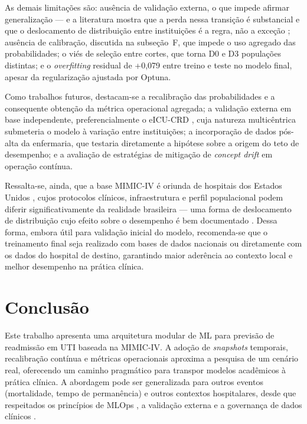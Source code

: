 \documentclass{ieeeaccess}
\begin{document}
As demais limitações são: ausência de validação externa, o que impede afirmar generalização --- e a literatura mostra que a perda nessa transição é substancial \cite{Koumantakis2025,Lim2025} e que o deslocamento de distribuição entre instituições é a regra, não a exceção \cite{Finlayson2021}; ausência de calibração, discutida na subseção~F, que impede o uso agregado das probabilidades; o viés de seleção entre cortes, que torna D0 e D3 populações distintas; e o \textit{overfitting} residual de +0,079 entre treino e teste no modelo final, apesar da regularização ajustada por Optuna.

Como trabalhos futuros, destacam-se a recalibração das probabilidades e a consequente obtenção da métrica operacional agregada; a validação externa em base independente, preferencialmente o eICU-CRD \cite{Pollard2018}, cuja natureza multicêntrica submeteria o modelo à variação entre instituições; a incorporação de dados pós-alta da enfermaria, que testaria diretamente a hipótese sobre a origem do teto de desempenho; e a avaliação de estratégias de mitigação de \textit{concept drift} em operação contínua.

Ressalta-se, ainda, que a base MIMIC-IV é oriunda de hospitais dos Estados Unidos \cite{Johnson2023}, cujos protocolos clínicos, infraestrutura e perfil populacional podem diferir significativamente da realidade brasileira --- uma forma de deslocamento de distribuição cujo efeito sobre o desempenho é bem documentado \cite{Finlayson2021}. Dessa forma, embora útil para validação inicial do modelo, recomenda-se que o treinamento final seja realizado com bases de dados nacionais ou diretamente com os dados do hospital de destino, garantindo maior aderência ao contexto local e melhor desempenho na prática clínica.


\section{Conclusão}
Este trabalho apresenta uma arquitetura modular de ML para previsão de readmissão em UTI baseada na MIMIC-IV. A adoção de \textit{snapshots} temporais, recalibração contínua e métricas operacionais aproxima a pesquisa de um cenário real, oferecendo um caminho pragmático para transpor modelos acadêmicos à prática clínica. A abordagem pode ser generalizada para outros eventos (mortalidade, tempo de permanência) e outros contextos hospitalares, desde que respeitados os princípios de MLOps \cite{Kreuzberger2023}, a validação externa \cite{Koumantakis2025} e a governança de dados clínicos \cite{Bender2013}.
\end{document}
